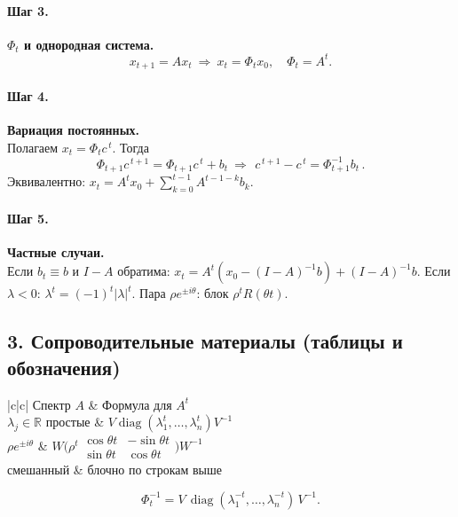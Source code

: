 \paragraph{Шаг 3.} \textbf{\(\Phi_t\) и однородная система.}\\
\[
x_{t+1}=Ax_t\ \Rightarrow\ x_t=\Phi_t x_0,\quad \Phi_t=A^t.
\]

\paragraph{Шаг 4.} \textbf{Вариация постоянных.}\\
Полагаем \(x_t=\Phi_t c^{\,t}\). Тогда
\[
\Phi_{t+1}c^{\,t+1}=\Phi_{t+1}c^{\,t}+b_t\ \Rightarrow\ 
\boxed{\,c^{\,t+1}-c^{\,t}=\Phi_{t+1}^{-1}b_t\,}.
\]
Эквивалентно: \(x_t=A^t x_0+\sum_{k=0}^{t-1}A^{t-1-k}b_k\).

\paragraph{Шаг 5.} \textbf{Частные случаи.}\\
Если \(b_t\equiv b\) и \(I-A\) обратима: \(x_t=A^t(x_0-(I-A)^{-1}b)+(I-A)^{-1}b\). Если \(\lambda<0\): \(\lambda^t=(-1)^t|\lambda|^t\). Пара \(\rho e^{\pm i\theta}\): блок \(\rho^tR(\theta t)\).

\subsection*{3. Сопроводительные материалы (таблицы и обозначения)}

\begin{center}
\begin{tabular}{|c|c|}
\hline
Спектр \(A\) & Формула для \(A^t\)\\
\hline
\(\lambda_j\in\mathbb R\) простые & \(V\operatorname{diag}(\lambda_1^t,\dots,\lambda_n^t)V^{-1}\)\\
\hline
\(\rho e^{\pm i\theta}\) & \(W\bigl(\rho^t\begin{smallmatrix}\cos\theta t&-\sin\theta t\\ \sin\theta t&\cos\theta t\end{smallmatrix}\bigr)W^{-1}\)\\
\hline
смешанный & блочно по строкам выше\\
\hline
\end{tabular}
\end{center}

\[
\Phi_t^{-1}=V\,\operatorname{diag}(\lambda_1^{-t},\dots,\lambda_n^{-t})\,V^{-1}.
\]

